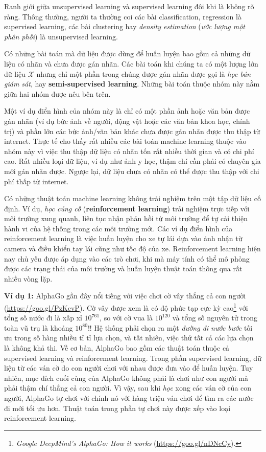 Ranh giới giữa unsupervised learning và supervised learning đôi khi là không rõ
ràng. Thông thường, người ta thường coi các bài classification, regression là
supervised learning, các bài clustering hay \textit{density estimation}
(\textit{ước lượng một phân phối}) là unsupervised learning. 

Có những bài toán mà dữ liệu được dùng để huấn luyện bao gồm cả những dữ liệu có
nhãn và chưa được gán nhãn. Các bài toán khi chúng ta có
một lượng lớn dữ liệu $\mathcal{X}$ nhưng chỉ một phần trong chúng được gán nhãn
được gọi là \textit{học bán giám sát}, hay \textbf{semi-supervised learning}.
Những bài toán thuộc nhóm này nằm giữa hai nhóm được nêu bên trên.

Một ví dụ điển hình của nhóm này là chỉ có một phần ảnh hoặc văn bản được gán
nhãn (ví dụ bức ảnh về người, động vật hoặc các văn bản khoa học, chính trị) và
phần lớn các bức ảnh/văn bản khác chưa được gán nhãn được thu thập từ internet.
Thực tế cho thấy rất nhiều các bài toán machine learning thuộc vào nhóm này vì
việc thu thập dữ liệu có nhãn tốn rất nhiều thời gian và có chi phí cao. Rất
nhiều loại dữ liệu, ví dụ như ảnh y học, thậm chí cần phải có chuyên gia mới gán
nhãn được. Ngược lại, dữ liệu chưa có nhãn có thể được thu thập với chi phí thấp
từ internet.

Có những thuật toán machine learning không trải nghiệm trên một tập dữ liệu
cố định. Ví dụ, \textit{học củng cố} (\textbf{reinforcement learning}) trải
nghiệm trực tiếp với môi trường xung quanh, liên tục nhận phản hồi từ môi trường
để tự cải thiện hành vi của hệ thống trong các môi trường mới. Các ví dụ điển
hình của reinforcement learning là việc huấn luyện cho xe tự lái dựa vào ảnh
nhận từ camera và điều khiển tay lái cũng như tốc độ của xe. Reinforcement
learning hiện nay chủ yếu được áp dụng vào các trò chơi, khi mà máy tính có thể
mô phỏng được các trạng thái của môi trường và huấn luyện thuật toán thông qua
rất nhiều vòng lặp.

\textbf{Ví dụ 1:} AlphaGo gần đây nổi tiếng với việc chơi cờ vây thắng cả con
người (\url{https://goo.gl/PzKcvP}). {Cờ vây được xem là có độ phức tạp cực kỳ
cao}\footnote{\textit{Google DeepMind's AlphaGo: How it
works} (\url{https://goo.gl/nDNcCy}).} với tổng số nước đi là xấp xỉ $10^{761}
$,
so với cờ vua là $10^{120} $ và tổng số nguyên tử trong toàn vũ trụ là khoảng
$10^{80}$!! Hệ thống phải chọn ra một \textit{đường đi nước bước} tối ưu trong
số hàng nhiều tỉ tỉ lựa chọn, và tất nhiên, việc thử tất cả các lựa chọn là
không khả thi. Về cơ bản, AlphaGo bao gồm các thuật toán thuộc cả supervised
learning và reinforcement learning. Trong phần supervised learning, dữ liệu từ
các ván cờ do con người chơi với nhau được đưa vào để huấn luyện. Tuy nhiên, mục
đích cuối cùng của AlphaGo không phải là chơi như con người mà phải thậm chí
thắng cả con người. Vì vậy, sau khi \textit{học} xong các ván cờ của con người,
AlphaGo tự chơi với chính nó với hàng triệu ván chơi để tìm ra các nước đi mới
tối ưu hơn. Thuật toán trong phần tự chơi này được xếp vào loại reinforcement
learning.

